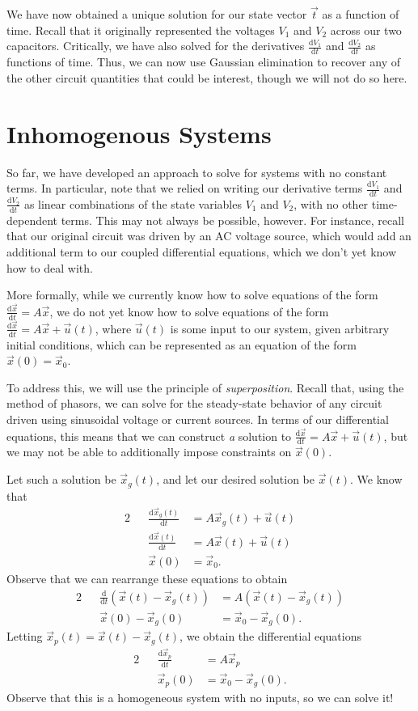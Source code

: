 \documentclass[letterpaper]{article}
\theoremstyle{remark}
\newcommand{\dt}{\mathrm{d}t}
\newcommand{\diff}{\mathrm{d}}
\newcommand{\eqn}[1]{\begin{alignat*}{2}#1\end{alignat*}}
\begin{document}
We have now obtained a unique solution for our state vector $\vec{t}$ as a function of time. Recall that it originally represented the voltages $V_1$ and $V_2$ across our two capacitors. Critically, we have also solved for the derivatives $\frac{\diff V_1}{\dt}$ and $\frac{\diff V_2}{\dt}$ as functions of time. Thus, we can now use Gaussian elimination to recover any of the other circuit quantities that could be interest, though we will not do so here.

\section{Inhomogenous Systems}
So far, we have developed an approach to solve for systems with no constant terms. In particular, note that we relied on writing our derivative terms $\frac{\diff V_1}{\dt}$ and $\frac{\diff V_2}{\dt}$ as linear combinations of the state variables $V_1$ and $V_2$, with no other time-dependent terms. This may not always be possible, however. For instance, recall that our original circuit was driven by an AC voltage source, which would add an additional term to our coupled differential equations, which we don't yet know how to deal with.

More formally, while we currently know how to solve equations of the form $\frac{\diff \vec{x}}{\dt} = A\vec{x}$, we do not yet know how to solve equations of the form $\frac{\diff \vec{x}}{\dt} = A\vec{x} + \vec{u}(t)$, where $\vec{u}(t)$ is some input to our system, given arbitrary initial conditions, which can be represented as an equation of the form $\vec{x}(0) = \vec{x}_0$.

To address this, we will use the principle of \emph{superposition}. Recall that, using the method of phasors, we can solve for the steady-state behavior of any circuit driven using sinusoidal voltage or current sources. In terms of our differential equations, this means that we can construct \emph{a} solution to $\frac{\diff \vec{x}}{\dt} = A\vec{x} + \vec{u}(t)$, but we may not be able to additionally impose constraints on $\vec{x}(0)$. 

Let such a solution be $\vec{x}_g(t)$, and let our desired solution be $\vec{x}(t)$. We know that
\eqn{
    && \frac{\diff \vec{x}_g(t)}{\dt} &= A\vec{x}_g(t) + \vec{u}(t) \\
    && \frac{\diff \vec{x}(t)}{\dt} &= A\vec{x}(t) + \vec{u}(t) \\
    && \vec{x}(0) &= \vec{x}_0.
}
Observe that we can rearrange these equations to obtain
\eqn{
    && \frac{\diff}{\dt} (\vec{x}(t) - \vec{x}_g(t)) &= A(\vec{x}(t) - \vec{x}_g(t)) \\
    && \vec{x}(0) - \vec{x}_g(0) &= \vec{x}_0 - \vec{x}_g(0).
}
Letting $\vec{x}_p(t) = \vec{x}(t) - \vec{x}_g(t)$, we obtain the differential equations
\eqn{
    && \frac{\diff \vec{x}_p}{\dt} &= A\vec{x}_p \\
    && \vec{x}_p(0) &= \vec{x}_0 - \vec{x}_g(0).
}
Observe that this is a homogeneous system with no inputs, so we can solve it! 
\end{document}
